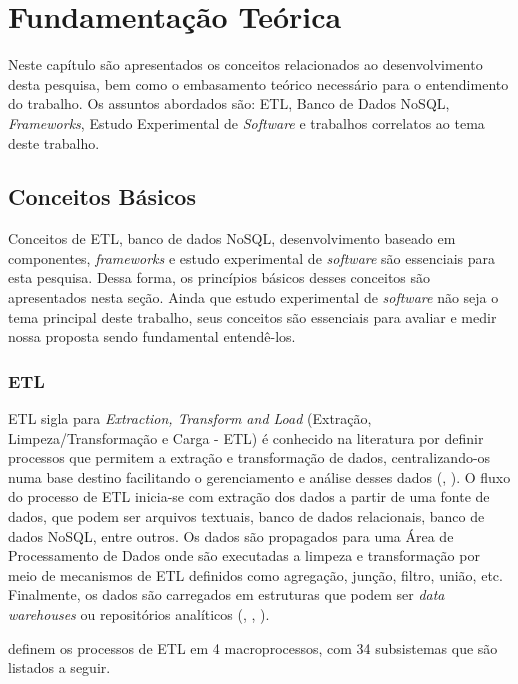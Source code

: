 \chapter{Fundamentação Teórica}

Neste capítulo são apresentados os conceitos relacionados ao desenvolvimento desta pesquisa, bem como o embasamento teórico necessário para o entendimento do trabalho. Os assuntos abordados são: ETL, Banco de Dados NoSQL, \textit{Frameworks}, Estudo Experimental de \textit{Software} e trabalhos correlatos ao tema deste trabalho.


\clearpage

\section{Conceitos Básicos}

Conceitos de ETL, banco de dados NoSQL, desenvolvimento baseado em componentes, \textit{frameworks} e estudo experimental de \textit{software} são essenciais para esta pesquisa. Dessa forma, os princípios básicos desses conceitos são apresentados nesta seção. Ainda que estudo experimental de \textit{software} não seja o tema principal deste trabalho, seus conceitos são essenciais para avaliar e medir nossa proposta sendo fundamental entendê-los.

\subsection{ETL}

ETL sigla para \textit{Extraction, Transform and Load} (Extração, Limpeza/Transformação e Carga - ETL) é conhecido na literatura por definir processos que permitem a extração e transformação de dados, centralizando-os numa base destino facilitando o gerenciamento e análise desses dados (\cite{kimball:2004}, \cite{rud:2009}). O fluxo do processo de ETL inicia-se com extração dos dados a partir de uma fonte de dados, que podem ser arquivos textuais, banco de dados relacionais, banco de dados NoSQL, entre outros. Os dados são propagados para uma Área de Processamento de Dados onde são executadas a limpeza e transformação por meio de mecanismos de ETL definidos como agregação, junção, filtro, união, etc. Finalmente, os dados são carregados em estruturas que podem ser \textit{data warehouses} ou repositórios analíticos (\cite{silva:2016}, \cite{silva:2012}, \cite{kimball:2004}). 

\cite{kimball:2004} definem os processos de ETL em 4 macroprocessos, com 34 subsistemas que são listados a seguir. 

